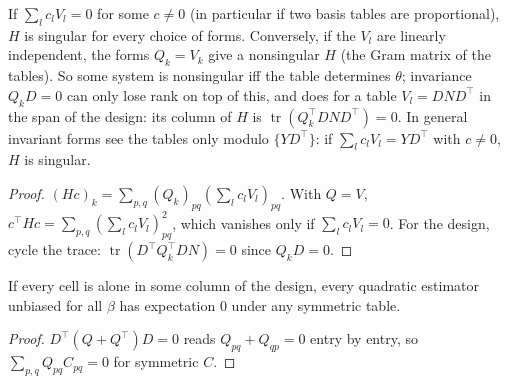 \begin{lemma}\label{lem:henderson_singular}
  \leanok
  If $\sum_lc_lV_l = 0$ for some $c \ne 0$ (in particular if two basis tables are
  proportional), $H$ is singular for every choice of forms. Conversely, if the $V_l$ are
  linearly independent, the forms $Q_k = V_k$ give a nonsingular $H$ (the Gram matrix of the
  tables). So some system is nonsingular iff the table determines $\theta$; invariance
  $Q_kD = 0$ can only lose rank on top of this, and does for a table $V_l = DND^\top$ in the
  span of the design: its column of $H$ is $\operatorname{tr}(Q_k^\top DND^\top) = 0$. In
  general invariant forms see the tables only modulo $\{YD^\top\}$: if
  $\sum_lc_lV_l = YD^\top$ with $c \ne 0$, $H$ is singular.
\end{lemma}
\begin{proof}
  \leanok
  $(Hc)_k = \sum_{p,q}(Q_k)_{pq}(\sum_lc_lV_l)_{pq}$. With $Q = V$,
  $c^\top Hc = \sum_{p,q}(\sum_lc_lV_l)_{pq}^2$, which vanishes only if $\sum_lc_lV_l = 0$.
  For the design, cycle the trace: $\operatorname{tr}(D^\top Q_k^\top DN) = 0$ since $Q_kD = 0$.
\end{proof}

\begin{theorem}\label{thm:unbiased_cells}
  \leanok
  If every cell is alone in some column of the design, every quadratic estimator unbiased for
  all $\beta$ has expectation $0$ under any symmetric table.
\end{theorem}
\begin{proof}
  \leanok
  $D^\top(Q + Q^\top)D = 0$ reads $Q_{pq} + Q_{qp} = 0$ entry by entry, so
  $\sum_{p,q}Q_{pq}C_{pq} = 0$ for symmetric $C$.
\end{proof}

